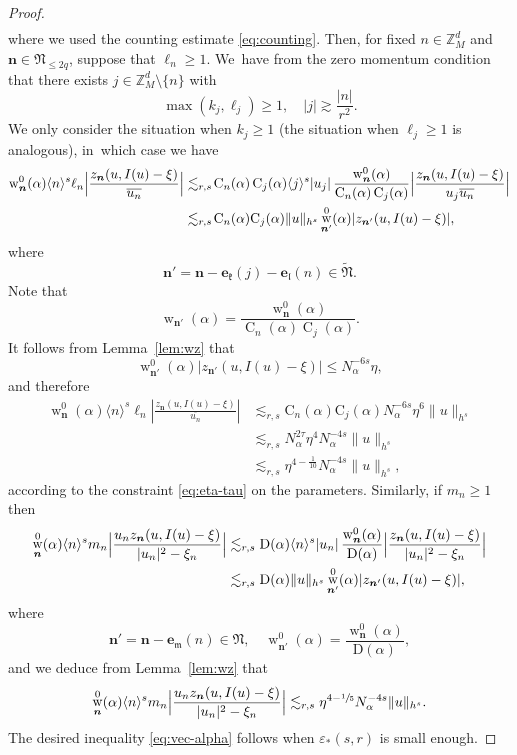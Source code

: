 \documentclass[JEP,XML,SOM,Unicode,published]{cedram}
\DeclareMathOperator{\rw}{w}
\theoremstyle{plain}
\theoremstyle{definition}
\newcommand{\nb}{{\boldsymbol n}}
\newcommand{\Nb}{{\boldsymbol{\mathfrak{N}}}}
\newcommand{\Z}{\mathbb{Z}}
\newcommand{\1}{\mathbf{1}}
\let\epsilon\varepsilon
\begin{document}
\begin{proof}
\begin{equation*}
\begin{split}
\end{split}
\end{equation*}
where we used the counting estimate \eqref{eq:counting}. Then, for fixed $n\in\Z_{M}^{d}$ and $\nb\in\Nb_{\leq2q}$, suppose that $\ell_{n}\geq1$. We~have from the zero momentum condition that there exists $j\in\Z_{M}^{d}\setminus\{n\}$ with
\[
\max(k_{j},\ell_{j})\geq1,\quad |j|\gtrsim \frac{|n|}{r^{2}}.
\]
We only consider the situation when $k_{j}\geq1$ (the situation when $\ell_{j}\geq1$ is analogous), in~which case we have
\begin{align*}
\operatorname{w}_{\nb}^{0}(\alpha)\langle n\rangle^{s}\ell_{n}\Bigl|\frac{z_{\nb}(u,I(u)-\xi)}{\overline{u_{n}}}\Bigr|
&\lesssim_{r,s}\!\operatorname{C}_{n}(\alpha)\operatorname{C}_{j}(\alpha)\langle j\rangle^{s}|u_{j}|\,\frac{\rw_{\nb}^{0}(\alpha)}{\operatorname{C}_{n}(\alpha)\operatorname{C}_{j}(\alpha)}\Bigl|\frac{z_{\nb}(u,I(u)-\xi)}{u_{j}\overline{u_{n}}}\Bigr|\\
&\lesssim_{r,s}\!\mathrm{C}_{n}(\alpha)\mathrm{C}_{j}(\alpha)\|u\|_{h^{s}}\rw_{\nb'}^{0}(\alpha)|z_{\nb'}(u,I(u)-\xi)|,
\end{align*}
where
\[
\nb' = \nb - \boldsymbol{e}_{\mathfrak{k}}(j) - \boldsymbol{e}_{\mathfrak{l}}(n) \in \widetilde{\Nb}.
\]
Note that
\[
\rw_{\nb'}(\alpha)=\frac{\rw_{\nb}^{0}(\alpha)}{\operatorname{C}_{n}(\alpha)\operatorname{C}_{j}(\alpha)}.
\]
It follows from Lemma~\ref{lem:wz} that
\[
\operatorname{w}_{\nb'}^{0}(\alpha)|z_{\nb'}(u,I(u)-\xi)| \leq N_{\alpha}^{-6s}\eta,
\]
and therefore
\begin{align*}
\operatorname{w}_{\nb}^{0}(\alpha)\langle n\rangle^{s}\ell_{n}|\frac{z_{\nb}(u,I(u)-\xi)}{\overline{u_{n}}}|
&\lesssim_{r,s} \mathrm{C}_{n}(\alpha)\mathrm{C}_{j}(\alpha) N_{\alpha}^{-6s}\eta^{6} \|u\|_{h^{s}} \\
&\lesssim_{r,s} N_{\alpha}^{2\tau} \eta^{4}N_{\alpha}^{-4s}\|u\|_{h^{s}} \\
&\lesssim_{r,s}\eta^{4-\frac{1}{10}}N_{\alpha}^{-4s}\|u\|_{h^{s}},
\end{align*}
according to the constraint \eqref{eq:eta-tau} on the parameters. Similarly, if $m_{n}\geq1$ then
\begin{align*}
\rw_{\nb}^{0}(\alpha)\langle n\rangle^{s}m_{n}\Bigl|\frac{u_{n}z_{\nb}(u,I(u)-\xi)}{|u_{n}|^{2}-\xi_{n}}\Bigr|
&\lesssim_{r,s}\mathrm{D}(\alpha)\langle n\rangle^{s}|u_{n}|\, \frac{\rw_{\nb}^{0}(\alpha)}{\mathrm{D}(\alpha)}\Bigl|\frac{z_{\nb}(u,I(u)-\xi)}{|u_n|^{2}-\xi_{n}}\Bigr| \\
&\lesssim_{r,s}\mathrm{D}(\alpha)\|u\|_{h^{s}} \rw_{\nb'}^{0}(\alpha)|z_{\nb'}(u,I(u)-\xi)|,
\end{align*}
where
\[
\nb' = \nb - \boldsymbol{e}_{\mathfrak{m}}(n) \in \Nb,\quad \rw_{\nb'}^{0}(\alpha)= \frac{\rw_{\nb}^{0}(\alpha)}{\mathrm{D}(\alpha)},
\]
and we deduce from Lemma~\ref{lem:wz} that
\[
\rw_{\nb}^{0}(\alpha)\langle n\rangle^{s}m_{n}\Bigl|\frac{u_{n}z_{\nb}(u,I(u)-\xi)}{|u_{n}|^{2}-\xi_{n}}\Bigr|
\lesssim_{r,s}\eta^{4-\sfrac{1}{5}}N_{\alpha}^{-4s}\|u\|_{h^{s}}.
\]
The desired inequality \eqref{eq:vec-alpha} follows when $\epsilon_{\ast}(s,r)$ is small enough.
\end{proof}
\end{document}
